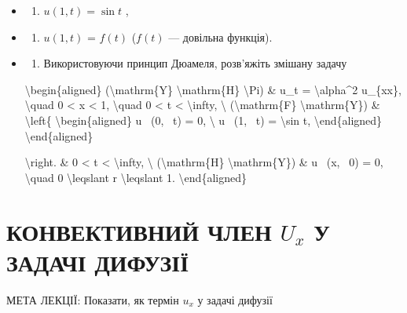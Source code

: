 \documentclass[
]{article}
\providecommand{\tightlist}{%
  \setlength{\itemsep}{0pt}\setlength{\parskip}{0pt}}
\begin{document}
\begin{itemize}
\item
  \begin{enumerate}
  \def\labelenumi{\alph{enumi})}
  \tightlist
  \item
    \(u(1, t) = \sin t\) ,
  \end{enumerate}
\item
  \begin{enumerate}
  \def\labelenumi{\alph{enumi})}
  \setcounter{enumi}{1}
  \tightlist
  \item
    \(u(1, t)\) = \(f(t)\) (\(f(t)\) --- довільна функція).
  \end{enumerate}
\item
  \begin{enumerate}
  \def\labelenumi{\arabic{enumi}.}
  \setcounter{enumi}{3}
  \tightlist
  \item
    Використовуючи принцип Дюамеля, розв'яжіть змішану задачу
  \end{enumerate}

  \textbackslash begin\{aligned\} (\textbackslash mathrm\{Y\}
  \textbackslash mathrm\{H\} \textbackslash Pi) \& u\_t =
  \textbackslash alpha\^{}2 u\_\{xx\}, \textbackslash quad 0 \textless{}
  x \textless{} 1, \textbackslash quad 0 \textless{} t \textless{}
  \textbackslash infty, \textbackslash{} (\textbackslash mathrm\{F\}
  \textbackslash mathrm\{Y\}) \& \textbackslash left\{
  \textbackslash begin\{aligned\} u ~(0, ~t) = 0, \textbackslash{} u
  ~(1, ~t) = \textbackslash sin t, \textbackslash end\{aligned\}
  \textbackslash end\{aligned\}

  \textbackslash right. \& 0 \textless{} t \textless{}
  \textbackslash infty, \textbackslash{} (\textbackslash mathrm\{H\}
  \textbackslash mathrm\{Y\}) \& u ~(x, ~0) = 0, \textbackslash quad 0
  \textbackslash leqslant r \textbackslash leqslant 1.
  \textbackslash end\{aligned\}
\end{itemize}

\section{\texorpdfstring{КОНВЕКТИВНИЙ ЧЛЕН \(U_x\) У ЗАДАЧІ
ДИФУЗІЇ}{КОНВЕКТИВНИЙ ЧЛЕН U\_x У ЗАДАЧІ ДИФУЗІЇ}}\label{ux43aux43eux43dux432ux435ux43aux442ux438ux432ux43dux438ux439-ux447ux43bux435ux43d-u_x-ux443-ux437ux430ux434ux430ux447ux456-ux434ux438ux444ux443ux437ux456ux457}

МЕТА ЛЕКЦІЇ: Показати, як термін \(u_x\) у задачі дифузії
\end{document}
